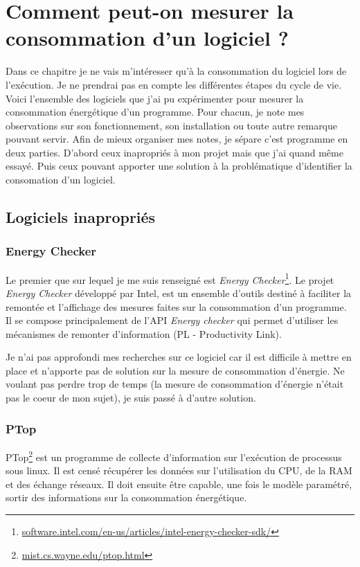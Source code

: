 \documentclass[a4paper, 11pt]{report}
\begin{document}
\chapter{Comment peut-on mesurer la consommation d'un logiciel ?}
Dans ce chapitre je ne vais m'intéresser qu'à la consommation du logiciel lors de l'exécution. Je ne prendrai pas en compte les différentes étapes du cycle de vie. Voici l'ensemble des logiciels que j'ai pu expérimenter pour mesurer la consommation énergétique d'un programme. Pour chacun, je note mes observations sur son fonctionnement, son installation ou toute autre remarque pouvant servir. Afin de mieux organiser mes notes, je sépare c'est programme en deux parties. D'abord ceux inapropriés à mon projet mais que j'ai quand même essayé. Puis ceux pouvant apporter une solution à la problématique d'identifier la consomation d'un logiciel.

	\section{Logiciels inapropriés}
		\subsection{Energy Checker}
Le premier que sur lequel je me suis renseigné est \textit{Energy Checker}\footnote{\href{http://software.intel.com/en-us/articles/intel-energy-checker-sdk/}{software.intel.com/en-us/articles/intel-energy-checker-sdk/}}. Le projet \textit{Energy Checker} développé par Intel, est un ensemble d’outils destiné à faciliter la remontée et l’affichage des mesures faites sur la consommation d’un programme. Il se compose principalement de l’API \textit{Energy checker} qui permet d’utiliser les mécanismes de remonter d’information (PL - Productivity Link).
 
Je n'ai pas approfondi mes recherches sur ce logiciel car il est difficile à mettre en place et n'apporte pas de solution sur la mesure de consommation d'énergie. Ne voulant pas perdre trop de temps (la mesure de consommation d'énergie n'était pas le coeur de mon sujet), je suis passé à d'autre solution. 

		\subsection{PTop}
PTop\footnote{\href{http://mist.cs.wayne.edu/ptop.html}{mist.cs.wayne.edu/ptop.html}} est un programme de collecte d’information sur l'exécution de processus sous linux. Il est censé récupérer les données sur l'utilisation du CPU, de la RAM et des échange réseaux. Il doit ensuite être capable, une fois le modèle paramétré, sortir des informations sur la consommation énergétique.
\end{document}
